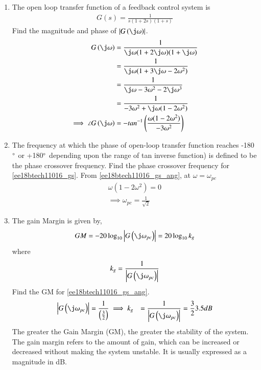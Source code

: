 \begin{enumerate}[label=\thesubsection.\arabic*.,ref=\thesubsection.\theenumi]
\item The open loop transfer function of a feedback control system is  
\begin{align}
G(s) = \frac{1}{s(1+2s)(1+s)} 
\label{ee18btech11016_gs}
\end{align}
%
Find the magnitude and phase of $\abs{G\brak{\j\omega}}$.
\\
\solution
\begin{align}
G\brak{\j\omega} &= \frac{1}{\j\omega(1+2\j\omega)(1+\j\omega)} 
\\
 &= \frac{1}{\j\omega(1+3\j\omega-2\omega^2)}
\\
&=\frac{1}{\j\omega-3\omega^2-2\j\omega^3}
\\
 &= \frac{1}{-3\omega^2+\j\omega(1-2\omega^2)} 
\\
\implies \angle G\brak{\j\omega}&=- tan^{-1}\brak{\frac{\omega(1-2\omega^2)}{-3\omega^2}}
\label{ee18btech11016_gs_ang}
\end{align}
%
\item The frequency at which the phase of open-loop transfer function reaches -180$\degree$ or +180$\degree$ depending upon the range of tan inverse function) is defined to be the phase crossover frequency.  Find the phase crossover frequency for  \eqref{ee18btech11016_gs}.
\solution From \eqref{ee18btech11016_gs_ang}, at $\omega=\omega_{pc}$ 
\begin{align}
\omega(1-2\omega^2) = 0 
\\
\implies \omega_{pc} = \frac{1}{\sqrt{2}} 
\end{align}
\item The gain Margin is given by,
\begin{align}
\label{eq:ee18btech11016_gm_def}
GM = -20\log_{10}\abs{G\brak{\j\omega_{pc}}} = 20\log_{10}k_{g}
\end{align}
where 
\begin{align}
k_{g}=\frac{1}{\abs{G\brak{\j\omega_{pc}}}} 
\end{align}
%
Find the GM for \eqref{ee18btech11016_gs_ang}.
\\
\solution 
\begin{align}
\abs{G\brak{\j\omega_{pc}}} &= \frac{1}{\brak{\frac{3}{2}}}
\implies k_{g}&=\frac{1}{\abs{G\brak{\j\omega_{pc}}}} = \frac{3}{2}
3.5dB
\end{align}
The greater the Gain Margin (GM), the greater the stability of the system. The gain margin refers to the amount of gain, which can be increased or decreased without making the system unstable. It is usually expressed as a magnitude in dB.

\end{enumerate}
